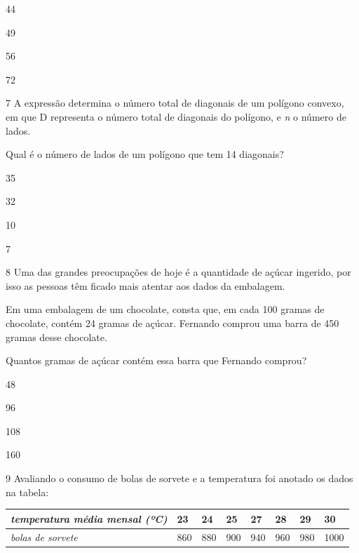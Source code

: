 \begin{escolha}

\item
  44
\item
  49
\item
  56
\item
  72
\end{escolha}

\num{7} A expressão determina o número total de diagonais de um polígono convexo, em que D representa o número total de diagonais do polígono, e \emph{n} o número de lados. 

Qual é o número de lados de um polígono que tem 14 diagonais?

\begin{escolha}
\item 35

\item 32

\item 10

\item 7
\end{escolha}



\num{8} Uma das grandes preocupações de hoje é a quantidade de açúcar ingerido, por isso as pessoas têm ficado mais atentar aos dados da embalagem.

Em uma embalagem de um chocolate, consta que, em cada 100 gramas de
chocolate, contém 24 gramas de açúcar. Fernando comprou uma barra de 450
gramas desse chocolate.

Quantos gramas de açúcar contém essa barra que Fernando comprou?

\begin{escolha}
\item 48 

\item 96 

\item 108 

\item 160
\end{escolha}

\num{9} Avaliando o consumo de bolas de sorvete e a temperatura foi anotado
os dados na tabela:

\begin{longtable}[]{@{}llllllll@{}}
\toprule\noalign{}
\emph{temperatura média mensal (ºC)} & \textbf{23} & \textbf{24} &
\textbf{25} & \textbf{27} & \textbf{28} & \textbf{29} & \textbf{30} \\
\midrule\noalign{}
\endhead
\bottomrule\noalign{}
\endlastfoot
\emph{bolas de sorvete} & 860 & 880 & 900 & 940 & 960 & 980 & 1000 \\
\end{longtable}

